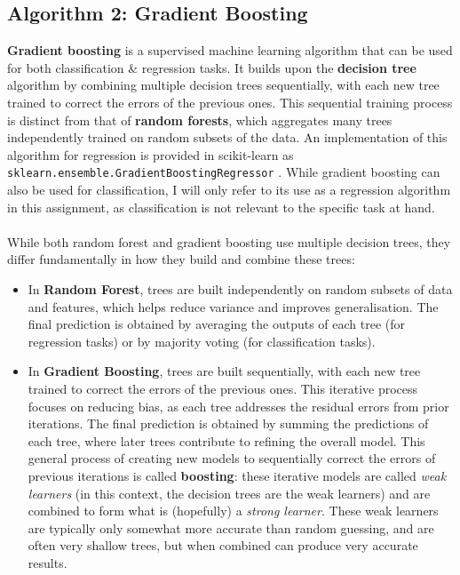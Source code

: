 \documentclass[a4paper]{article}
\begin{document}
\subsection{Algorithm 2: Gradient Boosting}\label{sec:alg2desc}
\textbf{Gradient boosting} is a supervised machine learning algorithm that can be used for both classification \& regression tasks. 
It builds upon the \textbf{decision tree} algorithm by combining multiple decision trees sequentially, with each new tree trained to correct the errors of the previous ones. 
This sequential training process is distinct from that of \textbf{random forests}, which aggregates many trees independently trained on random subsets of the data.
An implementation of this algorithm for regression is provided in scikit-learn as \texttt{sklearn.ensemble.GradientBoostingRegressor} \supercite{scikit_gradientboostingregressor}. 
While gradient boosting can also be used for classification, I will only refer to its use as a regression algorithm in this assignment, as classification is not relevant to the specific task at hand.
\\\\
While both random forest and gradient boosting use multiple decision trees, they differ fundamentally in how they build and combine these trees:
\begin{itemize}
    \item   In \textbf{Random Forest}, trees are built independently on random subsets of data and features, which helps reduce variance and improves generalisation. 
    The final prediction is obtained by averaging the outputs of each tree (for regression tasks) or by majority voting (for classification tasks).

    \item   In \textbf{Gradient Boosting}, trees are built sequentially, with each new tree trained to correct the errors of the previous ones. 
    This iterative process focuses on reducing bias, as each tree addresses the residual errors from prior iterations.
    The final prediction is obtained by summing the predictions of each tree, where later trees contribute to refining the overall model.
    This general process of creating new models to sequentially correct the errors of previous iterations is called \textbf{boosting}: these iterative models are called \textit{weak learners} (in this context, the decision trees are the weak learners) and are combined to form what is (hopefully) a \textit{strong learner}.
    These weak learners are typically only somewhat more accurate than random guessing, and are often very shallow trees, but when combined can produce very accurate results. 
\end{itemize}
\end{document}
